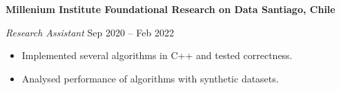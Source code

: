 \documentclass[../main.tex]{subfiles}
\begin{document}
    \textbf{Millenium Institute Foundational Research on Data \hfill  Santiago, Chile} \par
    \textit{Research Assistant} \hfill Sep 2020 -- Feb 2022 \par
    \begin{itemize}
        \item Implemented several algorithms in C++ and tested correctness.
        \item Analysed performance of algorithms with synthetic datasets.
\end{itemize} \par
\end{document}
